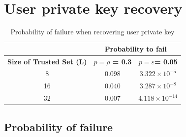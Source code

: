 %
%

\section{User private key recovery}
\label{sec:eval_private_key_recovery}
  \begin{table}
    \centering
    \footnotesize
    \begin{tabular}{|c|c|c|}
      \cline{2-3}
      \multicolumn{1}{c|}{}&  \multicolumn{2}{c|}{\textbf{Probability to fail}} \\ \cline{2-3}
      \hline
      \textbf{Size of Trusted Set (L)} & \textbf{$p = \rho$ = 0.3} &  \textbf{$p = \varepsilon$= 0.05} \\
      \hline \hline
      8 &  $0.098$ & $3.322 \times 10^{-5}$ \\
      \hline
      16 & $0.040$ & $3.287 \times 10^{-8}$  \\
      \hline
      32 & $0.007$ & $4.118 \times 10^{-14}$  \\
      \hline
    \end{tabular}
    \caption{Probability of failure when recovering user private key}
    \label{tab:p_private_key_recovery}
  \end{table}

  \subsection{Probability of failure}

